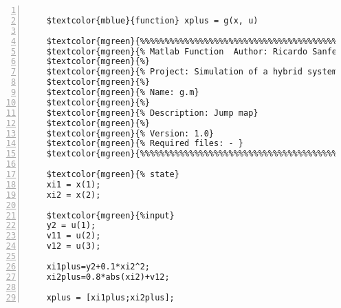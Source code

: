 %  
%  
%  
%  
  
  
\DefineShortVerb[fontfamily=courier,fontseries=m]{\$} 
\DefineShortVerb[fontfamily=courier,fontseries=b]{\#} 
  
\begin{Verbatim}[commandchars=\$\{\},numbers=left,numbersep=2pt] 

    $textcolor{mblue}{function} xplus = g(x, u) 
     
    $textcolor{mgreen}{%%%%%%%%%%%%%%%%%%%%%%%%%%%%%%%%%%%%%%%%%%%%%%%%%%%%%%%%%%%%%%%%%%%%%%%%%%%} 
    $textcolor{mgreen}{% Matlab Function  Author: Ricardo Sanfelice } 
    $textcolor{mgreen}{%} 
    $textcolor{mgreen}{% Project: Simulation of a hybrid system (interconnection)} 
    $textcolor{mgreen}{%} 
    $textcolor{mgreen}{% Name: g.m} 
    $textcolor{mgreen}{%} 
    $textcolor{mgreen}{% Description: Jump map} 
    $textcolor{mgreen}{%} 
    $textcolor{mgreen}{% Version: 1.0} 
    $textcolor{mgreen}{% Required files: - } 
    $textcolor{mgreen}{%%%%%%%%%%%%%%%%%%%%%%%%%%%%%%%%%%%%%%%%%%%%%%%%%%%%%%%%%%%%%%%%%%%%%%%%%%%} 
     
    $textcolor{mgreen}{% state} 
    xi1 = x(1); 
    xi2 = x(2); 
     
    $textcolor{mgreen}{%input} 
    y2 = u(1); 
    v11 = u(2); 
    v12 = u(3); 
     
    xi1plus=y2+0.1*xi2^2; 
    xi2plus=0.8*abs(xi2)+v12; 
     
    xplus = [xi1plus;xi2plus];  
\end{Verbatim}  
  
\UndefineShortVerb{\$} 
\UndefineShortVerb{\#} 
 